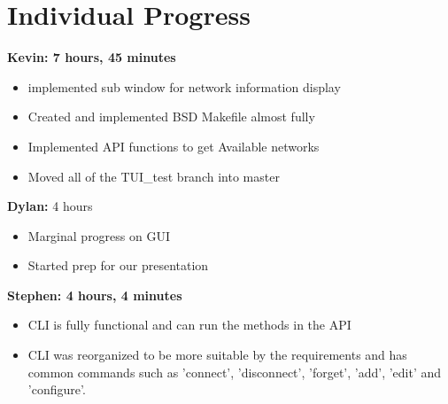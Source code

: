\documentclass[11pt]{article}
\begin{document}
\newpage
\section{Individual Progress}

\textbf{Kevin: 7 hours, 45 minutes}
\begin{itemize}
  \item implemented sub window for network information display
  \item Created and implemented BSD Makefile almost fully
  \item Implemented API functions to get Available networks
  \item Moved all of the TUI\_test branch into master
\end{itemize}

\textbf{Dylan:} 4 hours
\begin{itemize}
  \item Marginal progress on GUI
  \item Started prep for our presentation
\end{itemize}

\textbf{Stephen: 4 hours, 4 minutes}
\begin{itemize}
  \item CLI is fully functional and can run the methods in the API 
  \item CLI was reorganized to be more suitable by the requirements and has 
	common commands such as 'connect', 'disconnect', 'forget', 'add', 'edit' 
	and 'configure'.
\end{itemize}
\end{document}
